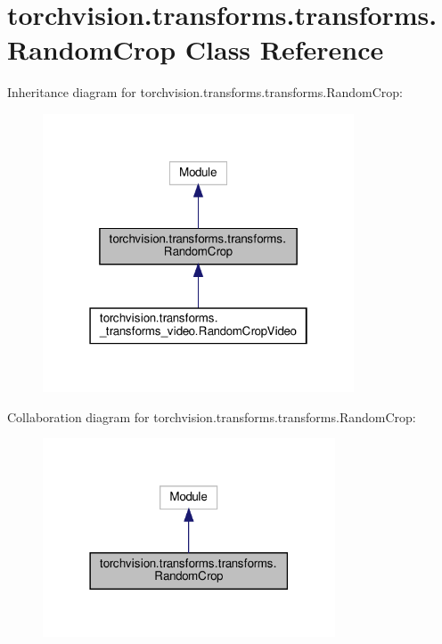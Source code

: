 \hypertarget{classtorchvision_1_1transforms_1_1transforms_1_1RandomCrop}{}\section{torchvision.\+transforms.\+transforms.\+Random\+Crop Class Reference}
\label{classtorchvision_1_1transforms_1_1transforms_1_1RandomCrop}


Inheritance diagram for torchvision.\+transforms.\+transforms.\+Random\+Crop\+:
\nopagebreak
\begin{figure}[H]
\begin{center}
\leavevmode
\includegraphics[width=262pt]{classtorchvision_1_1transforms_1_1transforms_1_1RandomCrop__inherit__graph}
\end{center}
\end{figure}


Collaboration diagram for torchvision.\+transforms.\+transforms.\+Random\+Crop\+:
\nopagebreak
\begin{figure}[H]
\begin{center}
\leavevmode
\includegraphics[width=246pt]{classtorchvision_1_1transforms_1_1transforms_1_1RandomCrop__coll__graph}
\end{center}
\end{figure}
